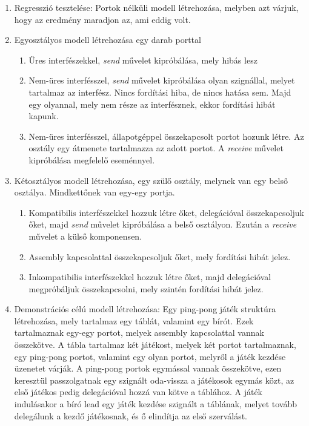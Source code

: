 \documentclass[a4paper,12pt]{report}
\begin{document}
\begin{enumerate}
\item Regresszió tesztelése: Portok nélküli modell létrehozása, melyben azt várjuk, hogy az eredmény maradjon az, ami eddig volt.
\item Egyosztályos modell létrehozása egy darab porttal
\begin{enumerate}
\item Üres interfészekkel, \textit{send} művelet kipróbálása, mely hibás lesz
\item Nem-üres interfésszel, \textit{send} művelet kipróbálása olyan szignállal, melyet tartalmaz az interfész. Nincs fordítási hiba, de nincs hatása sem. Majd egy olyannal, mely nem része az interfésznek, ekkor fordítási hibát kapunk.
\item Nem-üres interfésszel, állapotgéppel összekapcsolt portot hozunk létre. Az osztály egy átmenete tartalmazza az adott portot. A \textit{receive} művelet kipróbálása megfelelő eseménnyel.
\end{enumerate}
\item Kétosztályos modell létrehozása, egy szülő osztály, melynek van egy belső osztálya. Mindkettőnek van egy-egy portja.
\begin{enumerate}
\item Kompatibilis interfészekkel hozzuk létre őket, delegációval összekapcsoljuk őket, majd \textit{send} művelet kipróbálása a belső osztályon. Ezután a \textit{receive} művelet a külső komponensen.
\item Assembly kapcsolattal összekapcsoljuk őket, mely fordítási hibát jelez.
\item Inkompatibilis interfészekkel hozzuk létre őket, majd delegációval megpróbáljuk összekapcsolni, mely szintén fordítási hibát jelez.
\end{enumerate}
\item Demonstrációs célú modell létrehozása: Egy ping-pong játék struktúra létrehozása, mely tartalmaz egy táblát, valamint egy bírót. Ezek tartalmaznak egy-egy portot, melyek assembly kapcsolattal vannak összekötve. A tábla tartalmaz két játékost, melyek két portot tartalmaznak, egy ping-pong portot, valamint egy olyan portot, melyről a játék kezdése üzenetet várják. A ping-pong portok egymással vannak összekötve, ezen keresztül passzolgatnak egy szignált oda-vissza a játékosok egymás közt, az első játékos pedig delegációval hozzá van kötve a táblához. A játék indulásakor a bíró lead egy játék kezdése szignált a táblának, melyet tovább delegálunk a kezdő játékosnak, és ő elindítja az első szerválást.
\end{enumerate}
\end{document}
